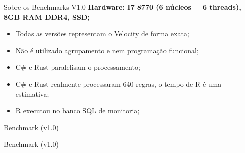 \documentclass[aspectratio=169]{beamer}
\begin{document}
\begin{frame}{Sobre os Benchmarks V1.0}	
	\textbf{Hardware: I7 8770 (6 núcleos + 6 threads), 8GB RAM DDR4, SSD;}
	
	\begin{itemize}
		\item Todas as versões representam o Velocity de forma exata;
		\item Não é utilizado agrupamento e nem programação funcional;
		\item C\# e Rust paralelisam o processamento;
		\item C\# e Rust realmente processaram 640 regras, o tempo de R é uma estimativa;
		\item R executou no banco SQL de monitoria;
	\end{itemize}
\end{frame}

\begin{frame}{Benchmark (v1.0)}
	\begin{figure}
	\end{figure}
\end{frame}

\begin{frame}{Benchmark (v1.0)}
	\begin{figure}
	\end{figure}
\end{frame}
\end{document}
